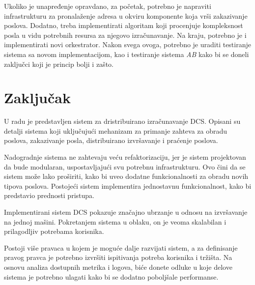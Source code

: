 \documentclass[12pt,oneside]{memoir}
\begin{document}
Ukoliko je unapređenje opravdano, za početak, potrebno je napraviti infrastrukturu za pronalaženje adresa u okviru komponente koja vrši zakazivanje poslova. Dodatno, treba implementirati algoritam koji procenjuje kompleksnost posla u vidu potrebnih resursa za njegovo izračunavanje. Na kraju, potrebno je i implementirati novi orkestrator. Nakon svega ovoga, potrebno je uraditi testiranje sistema sa novom implementacijom, kao i testiranje sistema \emph{AB} kako bi se doneli zaključci koji je princip bolji i zašto.


\section{Zaključak}
U radu je predstavljen sistem za dristribuirano izračunavanje DCS. Opisani su detalji sistema koji uključujući mehanizam za primanje zahteva za obradu poslova, zakazivanje posla, distribuirano izvršavanje i praćenje poslova.

Nadogradnje sistema ne zahtevaju veću refaktorizaciju, jer je sistem projektovan da bude modularan, uspostavljajući svu potrebnu infrastrukturu. Ovo čini da se sistem može lako proširiti, kako bi uveo dodatne funkcionalnosti za obradu novih tipova poslova. Postojeći sistem implementira jednostavnu funkcionalnost, kako bi predstavio prednosti pristupa.

Implementirani sistem DCS pokazuje značajno ubrzanje u odnosu na izvršavanje na jednoj mašini. Pokretanjem sistema u oblaku, on je veoma skalabilan i prilagodljiv potrebama korisnika.

Postoji više pravaca u kojem je moguće dalje razvijati sistem, a za definisanje pravog pravca je potrebno izvršiti ispitivanja potreba korisnika i tržišta. Na osnovu analiza dostupnih metrika i logova, biće donete odluke u koje delove sistema je potrebno ulagati kako bi se dodatno poboljšale performanse.

\literatura

\backmatter
\end{document}
